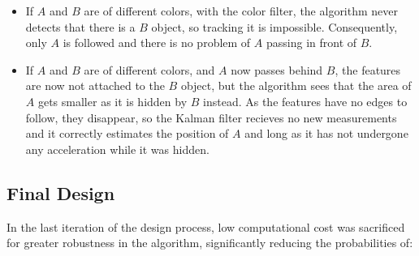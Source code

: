 \begin{itemize}
\item If $A$ and $B$ are of different colors, with the color filter, the algorithm never detects that there is a $ B $ object, so tracking it is impossible. Consequently, only $A$ is followed and there is no problem of $A$ passing in front of $B$.


\item If $A$ and $B$ are of different colors, and $A$ now passes behind $B$, the features are now not attached to the $B$ object, but the algorithm sees that the area of $A$ gets smaller as it is hidden by $B$ instead. As the features have no edges to follow, they disappear, so the Kalman filter recieves no new measurements and it correctly estimates the position of $A$ and long as it has not undergone any acceleration while it was hidden.

\end{itemize}























\subsection{Final Design}

In the last iteration of the design process, low computational cost was sacrificed for greater robustness in the algorithm, significantly reducing the probabilities of:

